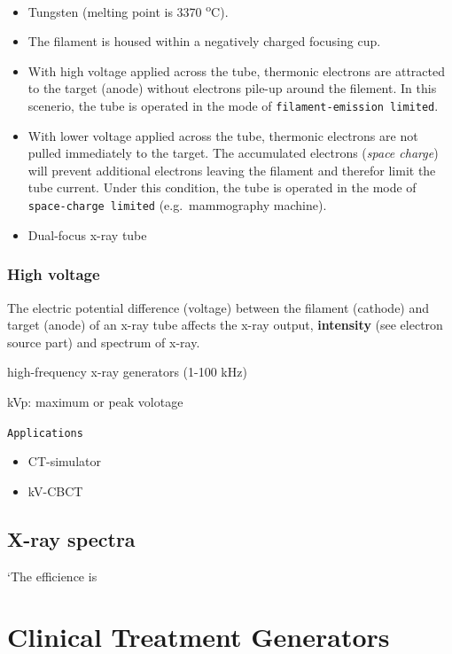 \documentclass[]{book}
\providecommand{\tightlist}{%
  \setlength{\itemsep}{0pt}\setlength{\parskip}{0pt}}
\theoremstyle{definition}
\theoremstyle{definition}
\theoremstyle{definition}
\theoremstyle{remark}
\begin{document}
\begin{itemize}
\tightlist
\item
  Tungsten (melting point is 3370 \textsuperscript{o}C).
\item
  The filament is housed within a negatively charged focusing cup.
\item
  With high voltage applied across the tube, thermonic electrons are
  attracted to the target (anode) without electrons pile-up around the
  filement. In this scenerio, the tube is operated in the mode of
  \texttt{filament-emission\ limited}.
\item
  With lower voltage applied across the tube, thermonic electrons are
  not pulled immediately to the target. The accumulated electrons
  (\emph{space charge}) will prevent additional electrons leaving the
  filament and therefor limit the tube current. Under this condition,
  the tube is operated in the mode of \texttt{space-charge\ limited}
  (e.g.~mammography machine).
\item
  Dual-focus x-ray tube
\end{itemize}

\subsection{High voltage}\label{high-voltage}

The electric potential difference (voltage) between the filament
(cathode) and target (anode) of an x-ray tube affects the x-ray output,
\textbf{intensity} (see electron source part) and spectrum of x-ray.

high-frequency x-ray generators (1-100 kHz)

kVp: maximum or peak volotage

\texttt{Applications}

\begin{itemize}
\tightlist
\item
  CT-simulator
\item
  kV-CBCT
\end{itemize}

\section{X-ray spectra}\label{x-ray-spectra}

`The efficience is

\chapter{Clinical Treatment Generators}\label{gene}
\end{document}
